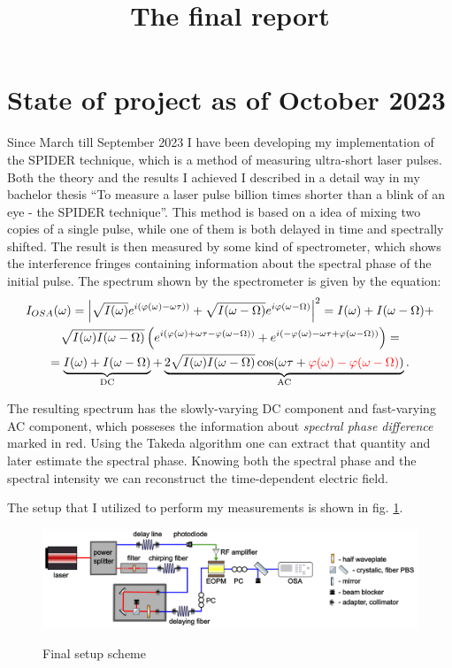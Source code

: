 \documentclass{article}
\begin{document}
\title{The final report}
\maketitle
\section{State of project as of October 2023}

Since March till September 2023 I have been developing my implementation of the SPIDER technique, which is a method of measuring ultra-short laser pulses. Both the theory and the results I achieved I described in a detail way in my bachelor thesis ``To measure a laser pulse billion times shorter than a blink of an eye - the SPIDER technique''. This method is based on a idea of mixing two copies of a single pulse, while one of them is both delayed in time and spectrally shifted. The result is then measured by some kind of spectrometer, which shows the interference fringes containing information about the spectral phase of the initial pulse. The spectrum shown by the spectrometer is given by the equation:
\begin{multline}
I_{OSA}(\omega) = \left|\sqrt{I(\omega)}e^{i(\varphi(\omega)-\omega\tau))}+\sqrt{I(\omega-\Omega)}e^{i\varphi(\omega-\Omega)}\right|^2 = I(\omega) + I(\omega-\Omega) +\\
\sqrt{I(\omega)I(\omega-\Omega)}\left(e^{i(\varphi(\omega)+\omega\tau-\varphi(\omega-\Omega))}+e^{i(-\varphi(\omega)-\omega\tau+\varphi(\omega-\Omega))}\right) =\\
= \underbrace{I(\omega) + I(\omega-\Omega)}_\text{DC} + \underbrace{2\sqrt{I(\omega)I(\omega-\Omega)}\cos(\omega\tau + \textcolor{red}{\varphi(\omega) - \varphi(\omega-\Omega)})}_\text{AC}.
\end{multline}

The resulting spectrum has the slowly-varying DC component and fast-varying AC component, which posseses the information about \emph{spectral phase difference} marked in red. Using the Takeda algorithm one can extract that quantity and later estimate the spectral phase. Knowing both the spectral phase and the spectral intensity we can reconstruct the time-dependent electric field.

The setup that I utilized to perform my measurements is shown in fig. \ref{setup}.

\begin{figure}[h]
\caption{Final setup scheme}
\centering
\includegraphics[scale = 0.6]{setup}
\label{setup}
\end{figure}
\end{document}
